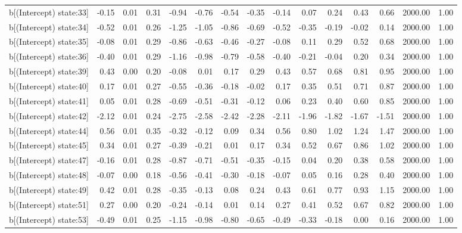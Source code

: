 \begin{table}[ht]
\begin{tabular}{rrrrrrrrrrrrrrr}
  b[(Intercept) state:33] & -0.15 & 0.01 & 0.31 & -0.94 & -0.76 & -0.54 & -0.35 & -0.14 & 0.07 & 0.24 & 0.43 & 0.66 & 2000.00 & 1.00 \\ 
  b[(Intercept) state:34] & -0.52 & 0.01 & 0.26 & -1.25 & -1.05 & -0.86 & -0.69 & -0.52 & -0.35 & -0.19 & -0.02 & 0.14 & 2000.00 & 1.00 \\ 
  b[(Intercept) state:35] & -0.08 & 0.01 & 0.29 & -0.86 & -0.63 & -0.46 & -0.27 & -0.08 & 0.11 & 0.29 & 0.52 & 0.68 & 2000.00 & 1.00 \\ 
  b[(Intercept) state:36] & -0.40 & 0.01 & 0.29 & -1.16 & -0.98 & -0.79 & -0.58 & -0.40 & -0.21 & -0.04 & 0.20 & 0.34 & 2000.00 & 1.00 \\ 
  b[(Intercept) state:39] & 0.43 & 0.00 & 0.20 & -0.08 & 0.01 & 0.17 & 0.29 & 0.43 & 0.57 & 0.68 & 0.81 & 0.95 & 2000.00 & 1.00 \\ 
  b[(Intercept) state:40] & 0.17 & 0.01 & 0.27 & -0.55 & -0.36 & -0.18 & -0.02 & 0.17 & 0.35 & 0.51 & 0.71 & 0.87 & 2000.00 & 1.00 \\ 
  b[(Intercept) state:41] & 0.05 & 0.01 & 0.28 & -0.69 & -0.51 & -0.31 & -0.12 & 0.06 & 0.23 & 0.40 & 0.60 & 0.85 & 2000.00 & 1.00 \\ 
  b[(Intercept) state:42] & -2.12 & 0.01 & 0.24 & -2.75 & -2.58 & -2.42 & -2.28 & -2.11 & -1.96 & -1.82 & -1.67 & -1.51 & 2000.00 & 1.00 \\ 
  b[(Intercept) state:44] & 0.56 & 0.01 & 0.35 & -0.32 & -0.12 & 0.09 & 0.34 & 0.56 & 0.80 & 1.02 & 1.24 & 1.47 & 2000.00 & 1.00 \\ 
  b[(Intercept) state:45] & 0.34 & 0.01 & 0.27 & -0.39 & -0.21 & 0.01 & 0.17 & 0.34 & 0.52 & 0.67 & 0.86 & 1.02 & 2000.00 & 1.00 \\ 
  b[(Intercept) state:47] & -0.16 & 0.01 & 0.28 & -0.87 & -0.71 & -0.51 & -0.35 & -0.15 & 0.04 & 0.20 & 0.38 & 0.58 & 2000.00 & 1.00 \\ 
  b[(Intercept) state:48] & -0.07 & 0.00 & 0.18 & -0.56 & -0.41 & -0.30 & -0.18 & -0.07 & 0.05 & 0.16 & 0.28 & 0.40 & 2000.00 & 1.00 \\ 
  b[(Intercept) state:49] & 0.42 & 0.01 & 0.28 & -0.35 & -0.13 & 0.08 & 0.24 & 0.43 & 0.61 & 0.77 & 0.93 & 1.15 & 2000.00 & 1.00 \\ 
  b[(Intercept) state:51] & 0.27 & 0.00 & 0.20 & -0.24 & -0.14 & 0.01 & 0.14 & 0.27 & 0.41 & 0.52 & 0.67 & 0.82 & 2000.00 & 1.00 \\ 
  b[(Intercept) state:53] & -0.49 & 0.01 & 0.25 & -1.15 & -0.98 & -0.80 & -0.65 & -0.49 & -0.33 & -0.18 & 0.00 & 0.16 & 2000.00 & 1.00 \\ 

\end{tabular}
\end{table}
